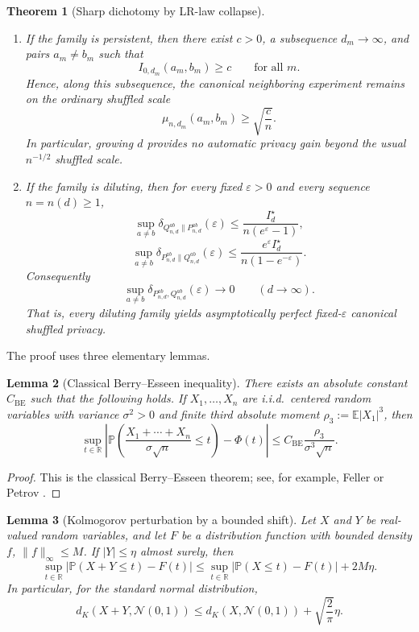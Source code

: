 \documentclass[11pt]{amsart}
\numberwithin{equation}{section}
\newtheorem{theorem}{Theorem}[section]
\newtheorem{lemma}[theorem]{Lemma}
\theoremstyle{definition}
\newcommand{\R}{\mathbb R}
\newcommand{\E}{\mathbb E}
\newcommand{\PP}{\mathbb P}
\newcommand{\GDP}{\mathrm{GDP}}
\newcommand{\Normal}{\mathcal N}
\begin{document}
\begin{theorem}[Sharp dichotomy by LR-law collapse]
\begin{enumerate}
experiment.
In particular, for every fixed
$\varepsilon\ge 0$ the exact one-sided privacy curve satisfies
$\delta_{Q_{n,d}\|P_{n,d}}(\varepsilon)\to \delta_{\GDP(\mu_{n,d})}(\varepsilon)$.
\item If the family is persistent, then there exist $c>0$, a subsequence $d_m\to\infty$,
and pairs $a_m\neq b_m$ such that
\[
I_{0,d_m}(a_m,b_m)\ge c
\qquad \text{for all }m.
\]
Hence, along this subsequence, the canonical neighboring experiment remains on the ordinary shuffled scale
\[
\mu_{n,d_m}(a_m,b_m)\ge \sqrt{\frac{c}{n}}.
\]
In particular, growing $d$ provides no automatic privacy gain beyond the usual $n^{-1/2}$ shuffled scale.
\item If the family is diluting, then for every fixed $\varepsilon>0$ and every sequence $n=n(d)\ge1$,
\[
\sup_{a\neq b}\delta_{Q_{n,d}^{ab}\|P_{n,d}^{ab}}(\varepsilon)
\le \frac{I_d^\star}{n(e^\varepsilon-1)}, \tag{6.6}\label{eq:delta-fwd}
\]
\[
\sup_{a\neq b}\delta_{P_{n,d}^{ab}\|Q_{n,d}^{ab}}(\varepsilon)
\le \frac{e^\varepsilon I_d^\star}{n(1-e^{-\varepsilon})}. \tag{6.7}\label{eq:delta-rev}
\]
Consequently
\[
\sup_{a\neq b}\delta_{P_{n,d}^{ab},Q_{n,d}^{ab}}(\varepsilon)\longrightarrow 0
\qquad (d\to\infty).
\]
That is, every diluting family yields asymptotically perfect fixed-$\varepsilon$ canonical shuffled privacy.
\end{enumerate}
\end{theorem}

The proof uses three elementary lemmas.

\begin{lemma}[Classical Berry--Esseen inequality]\label{lem:BE}
There exists an absolute constant $C_{\mathrm{BE}}$ such that the following holds.
If $X_1,\dots,X_n$ are i.i.d.\ centered random variables with variance $\sigma^2>0$ and finite third
absolute moment $\rho_3:=\E|X_1|^3$, then
\[
\sup_{t\in\R}
\left|
\PP\!\left(
\frac{X_1+\cdots+X_n}{\sigma\sqrt n}\le t
\right)-\Phi(t)
\right|
\le
C_{\mathrm{BE}}\frac{\rho_3}{\sigma^3\sqrt n}. \tag{6.8}\label{eq:BE-classical}
\]
\end{lemma}

\begin{proof}
This is the classical Berry--Esseen theorem; see, for example,
Feller \cite[Ch.~XVI, Thm.~2]{FellerVolII} or Petrov
\cite[Ch.~V, Thm.~3]{Petrov1975}.
\end{proof}

\begin{lemma}[Kolmogorov perturbation by a bounded shift]\label{lem:bounded-perturb}
Let $X$ and $Y$ be real-valued random variables, and let $F$ be a distribution function with bounded density
$f$, $\|f\|_\infty\le M$.
If $|Y|\le \eta$ almost surely, then
\[
\sup_{t\in\R}\bigl|\PP(X+Y\le t)-F(t)\bigr|
\le
\sup_{t\in\R}\bigl|\PP(X\le t)-F(t)\bigr| + 2M\eta. \tag{6.9}\label{eq:bounded-perturb}
\]
In particular, for the standard normal distribution,
\[
d_K(X+Y,\Normal(0,1))
\le d_K(X,\Normal(0,1))+\sqrt{\frac{2}{\pi}}\eta. \tag{6.10}\label{eq:normal-perturb}
\]
\end{lemma}
\end{document}
